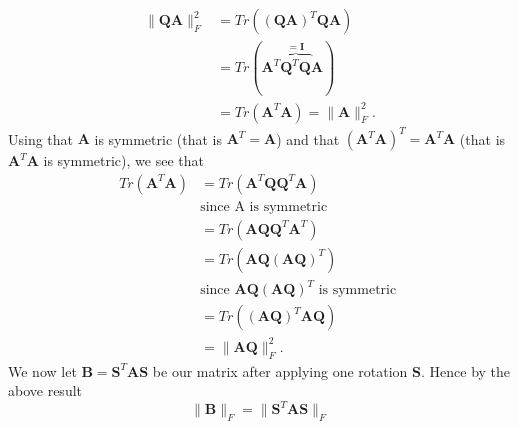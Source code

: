 \documentclass{emulateapj}
\begin{document}
        \begin{align*}
            \parallel\bm{Q}\bm{A}\parallel_{F}^{2}&=Tr\left(\left(\bm{Q}\bm{A}\right)^{T}\bm{Q}\bm{A}\right)
            \\
            &=Tr\left(\bm{A}^{T}\overbrace{\bm{Q}^{T}\bm{Q}}^{=\bm{I}}\bm{A}\right)
            \\
            &=Tr\left(\bm{A}^{T}\bm{A}\right)=\parallel\bm{A}\parallel_{F}^{2}.
        \end{align*}
        Using that \(\bm{A}\) is symmetric (that is \(\bm{A}^{T}=\bm{A}\)) and that \(\left(\bm{A}^{T}\bm{A}\right)^{T}=\bm{A}^{T}\bm{A}\) (that is \(\bm{A}^{T}\bm{A}\) is symmetric), we see that
        \begin{align*}
            Tr\left(\bm{A}^{T}\bm{A}\right)
            &= Tr\left(\bm{A}^{T}\bm{Q}\bm{Q}^{T}\bm{A}\right)
            \\
            &\text{since A is symmetric }%
            \\
            &= Tr\left(\bm{A}\bm{Q}\bm{Q}^{T}\bm{A}^{T}\right)
            \\
            &= Tr\left(\bm{A}\bm{Q}\left(\bm{A}\bm{Q}\right)^{T}\right)
            \\
            &\text{since }\bm{A}\bm{Q}\left(\bm{A}\bm{Q}\right)^{T}\text{ is symmetric }%
            \\
            &= Tr\left(\left(\bm{A}\bm{Q}\right)^{T}\bm{A}\bm{Q}\right)
            \\
            &=\parallel\bm{A}\bm{Q}\parallel_{F}^{2}.
        \end{align*}
        We now let \(\bm{B} = \bm{S}^T \bm{A} \bm{S}\) be our matrix after applying one rotation \(\bm{S}\). Hence by the above result
        \begin{equation}\label{eq:frobenius_conserved}
            \parallel \bm{B} \parallel_F = \parallel \bm{S}^{T}\bm{A}\bm{S} \parallel_F
        \end{equation}
        
\end{document}
